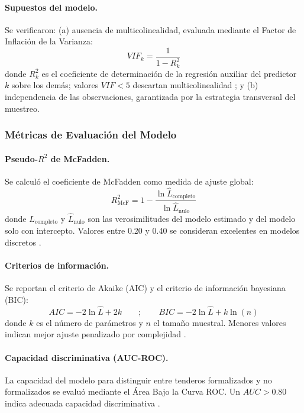 \documentclass[11pt,a4paper]{article}
\begin{document}
\paragraph{Supuestos del modelo.}
Se verificaron: (a) ausencia de multicolinealidad, evaluada mediante el Factor de Inflación de la Varianza:
\begin{equation}
    VIF_{k} = \frac{1}{1 - R_{k}^{2}}
\end{equation}
donde $R_{k}^{2}$ es el coeficiente de determinación de la regresión auxiliar del predictor $k$ sobre los demás; valores $VIF < 5$ descartan multicolinealidad \citep{hair2019}; y (b) independencia de las observaciones, garantizada por la estrategia transversal del muestreo.

\subsubsection{M\'etricas de Evaluaci\'on del Modelo}

\paragraph{Pseudo-$R^2$ de McFadden.}
Se calculó el coeficiente de McFadden \citep{greene2018} como medida de ajuste global:
\begin{equation}
    R_{\text{McF}}^{2} = 1 - \frac{\ln{\widehat{L}}_{\text{completo}}}{\ln{\widehat{L}}_{\text{nulo}}}
\end{equation}
 donde ${\widehat{L}}_{\text{completo}}$ y ${\widehat{L}}_{\text{nulo}}$ son las verosimilitudes del modelo estimado y del modelo solo con intercepto. Valores entre 0.20 y 0.40 se consideran excelentes en modelos discretos \citep{greene2018}.

\paragraph{Criterios de informaci\'on.}
Se reportan el criterio de Akaike (AIC) y el criterio de información bayesiana (BIC):
\begin{equation}
    AIC = - 2\ln\widehat{L} + 2k\quad\quad;\quad\quad BIC = - 2\ln\widehat{L} + k\ln(n)
\end{equation}
donde $k$ es el número de parámetros y $n$ el tamaño muestral. Menores valores indican mejor ajuste penalizado por complejidad \citep{burnham2002}.

\paragraph{Capacidad discriminativa (AUC-ROC).}
La capacidad del modelo para distinguir entre tenderos formalizados y no formalizados se evaluó mediante el Área Bajo la Curva ROC. Un $AUC > 0.80$ indica adecuada capacidad discriminativa \citep{hosmer2013}.
\end{document}
